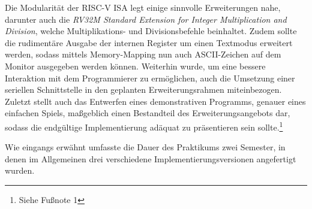 Die Modularit\"at der RISC-V ISA legt einige sinnvolle Erweiterungen nahe,
darunter auch die
\textit{RV32M Standard Extension for Integer Multiplication and Division},
welche Multiplikations- und Divisionsbefehle beinhaltet. Zudem sollte die
rudiment\"are Ausgabe der internen Register um einen Textmodus erweitert
werden, sodass mittels Memory-Mapping nun auch ASCII-Zeichen auf dem Monitor
ausgegeben werden k\"onnen. Weiterhin wurde, um eine bessere Interaktion mit
dem Programmierer zu erm\"oglichen, auch die Umsetzung einer seriellen
Schnittstelle in den geplanten Erweiterungsrahmen miteinbezogen. Zuletzt
stellt auch das Entwerfen eines demonstrativen Programms, genauer eines
einfachen Spiels, ma\ss{}geblich einen Bestandteil des Erweiterungsangebots
dar, sodass die endg\"ultige Implementierung ad\"aquat zu pr\"asentieren sein
sollte.\footnote{Siehe Fu\ss{}note 1}

Wie eingangs erw\"ahnt umfasste die Dauer des Praktikums zwei Semester, in
denen im Allgemeinen drei verschiedene Implementierungsversionen angefertigt
wurden.

